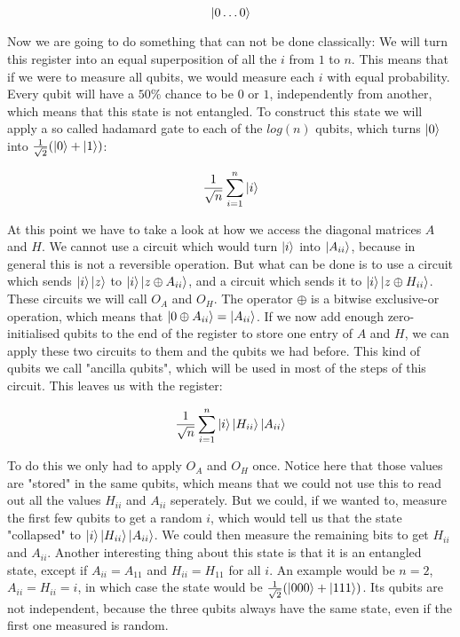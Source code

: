 \documentclass[11pt,a4paper]{scrartcl}
\begin{document}
\begin{equation*}
\ket{0\ldots 0}
\end{equation*}

Now we are going to do something that can not be done classically: We will turn this register into an equal superposition of all the $i$ from $1$ to $n$. This means that if we were to measure all qubits, we would measure each $i$ with equal probability. Every qubit will have a $50\%$ chance to be $0$ or $1$, independently from another, which means that this state is not entangled. To construct this state we will apply a so called hadamard gate to each of the $log(n)$ qubits, which turns $\ket{0}$ into $\frac{1}{\sqrt 2}(\ket{0}+\ket{1})$:

\begin{equation*}
\frac{1}{\sqrt{n}}\sum_{i=1}^n\ket{i}
\end{equation*}

At this point we have to take a look at how we access the diagonal matrices $A$ and $H$. We cannot use a circuit which would turn $\ket{i}$ into $\ket{A_{ii}}$, because in general this is not a reversible operation. But what can be done is to use a circuit which sends $\ket{i}\ket{z}$ to $\ket{i}\ket{z\oplus A_{ii}}$, and a circuit which sends it to $\ket{i}\ket{z\oplus H_{ii}}$. These circuits we will call $O_A$ and $O_H$. The operator $\oplus$ is a bitwise exclusive-or operation, which means that $\ket{0\oplus A_{ii}}=\ket{A_{ii}}$. If we now add enough zero-initialised qubits to the end of the register to store one entry of $A$ and $H$, we can apply these two circuits to them and the qubits we had before. This kind of qubits we call "ancilla qubits", which will be used in most of the steps of this circuit. This leaves us with the register:

\begin{equation*}
\frac{1}{\sqrt{n}}\sum_{i=1}^n\ket{i}\ket{H_{ii}}\ket{A_{ii}}
\end{equation*}

To do this we only had to apply $O_A$ and $O_H$ once. Notice here that those values are "stored" in the same qubits, which means that we could not use this to read out all the values $H_{ii}$ and $A_{ii}$ seperately. But we could, if we wanted to, measure the first few qubits to get a random $i$, which would tell us that the state "collapsed" to $\ket{i}\ket{H_{ii}}\ket{A_{ii}}$. We could then measure the remaining bits to get $H_{ii}$ and $A_{ii}$. Another interesting thing about this state is that it is an entangled state, except if $A_{ii}=A_{11}$ and $H_{ii}=H_{11}$ for all $i$. An example would be $n=2$, $A_{ii}=H_{ii}=i$, in which case the state would be $\frac{1}{\sqrt{2}}(\ket{000}+\ket{111})$. Its qubits are not independent, because the three qubits always have the same state, even if the first one measured is random.
\end{document}
